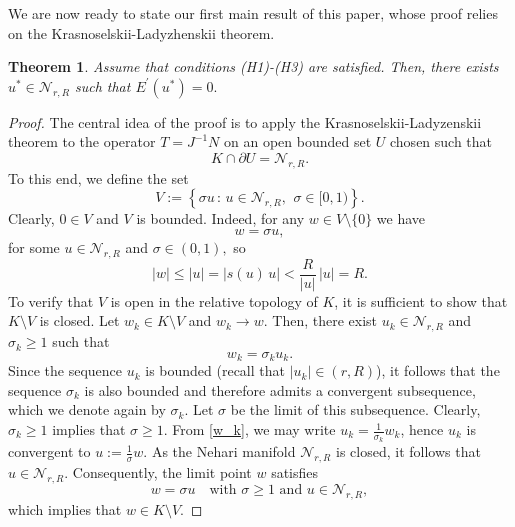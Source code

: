 \documentclass{birkjour}
\newtheorem{theorem}{Theorem}[section]
\theoremstyle{definition}
\theoremstyle{remark}
\numberwithin{equation}{section}
\begin{document}
We are now ready to state our first main result of this paper, whose proof
relies on the Krasnoselskii-Ladyzhenskii theorem.

\begin{theorem}
\label{t1} Assume that conditions (H1)-(H3) are satisfied. Then, there
exists $u^{\ast }\in \mathcal{N}_{r,R}$ such that $E^{\prime }\left( u^{\ast
}\right) =0.$
\end{theorem}

\begin{proof}
The central idea of the proof is to apply the Krasnoselskii-Ladyzenskii
theorem to the operator $T=J^{-1}N$ on an open bounded set $U$ chosen such
that
\begin{equation*}
K\cap \partial U=\mathcal{N}_{r,R}.
\end{equation*}%
To this end, we define the set
\begin{equation*}
V:=\left\{ \sigma u\,:\,u\in \mathcal{N}_{r,R},\,\ \sigma \in \lbrack
0,1)\right\} .
\end{equation*}%
Clearly, $0\in V$ and $V$ is bounded. Indeed, for any $w\in V\setminus \{0\}$
we have
\begin{equation*}
w=\sigma u,
\end{equation*}%
for some $u\in \mathcal{N}_{r,R}$ and $\sigma \in \left( 0,1\right) ,$ so
\begin{equation*}
|w|\leq |u|=|s(u)\,u|<\frac{R}{|u|}\,|u|=R.
\end{equation*}%
To verify that $V$ is open in the relative topology of $K$, it is sufficient
to show that $K\setminus V$ is closed. Let $w_{k}\in K\setminus V$ and $%
w_{k}\rightarrow w$. Then, there exist $u_{k}\in \mathcal{N}_{r,R}$ and $%
\sigma _{k}\geq 1$ such that
\begin{equation}
w_{k}=\sigma _{k}u_{k}.  \label{w_k}
\end{equation}%
Since the sequence $u_{k}$ is bounded (recall that $\left\vert
u_{k}\right\vert \in (r,R)$), it follows that the sequence $\sigma _{k}$ is
also bounded and therefore admits a convergent subsequence, which we denote
again by $\sigma _{k}$. Let $\sigma $ be the limit of this subsequence.
Clearly, $\sigma _{k}\geq 1$ implies that $\sigma \geq 1$. From \eqref{w_k},
we may write $u_{k}=\frac{1}{\sigma _{k}}w_{k}$, hence $u_{k}$ is convergent
to $u:=\frac{1}{\sigma }w$. As the Nehari manifold $\mathcal{N}_{r,R}$ is
closed, it follows that $u\in \mathcal{N}_{r,R}$. Consequently, the limit
point $w$ satisfies
\begin{equation*}
w=\sigma u\quad \text{with }\sigma \geq 1\text{ and }u\in \mathcal{N}_{r,R},
\end{equation*}%
which implies that $w\in K\setminus V$.


\end{proof}
\end{document}
